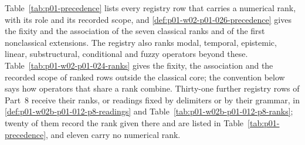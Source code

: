 Table~\ref{tab:p01-precedence} lists every registry row that carries a
numerical rank, with its role and its recorded scope, and
\cref{def:p01-w02-p01-026-precedence} gives the fixity and the association
of the seven classical ranks and of the first nonclassical extensions.
The registry also ranks modal, temporal, epistemic, linear,
substructural, conditional and fuzzy operators beyond these.
Table~\ref{tab:p01-w02-p01-024-ranks} gives the fixity, the association
and the recorded scope of ranked rows outside the classical core; the
convention below says how operators that share a rank combine.  Thirty-one further registry rows of
Part~8 receive their ranks, or readings fixed by delimiters or by their
grammar, in \cref{def:p01-w02b-p01-012-p8-readings} and
Table~\ref{tab:p01-w02b-p01-012-p8-ranks}; twenty of them record the rank
given there and are listed in Table~\ref{tab:p01-precedence}, and eleven
carry no numerical rank.

